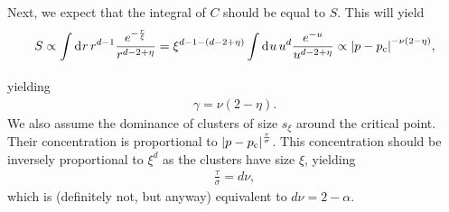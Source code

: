 Next, we expect that the integral of $C$ should be equal to $S$. This will yield
\begin{align*}
	S \propto \int\limits_{}^{}\dd[]{r}r^{d - 1}\frac{e^{-\frac{r}{\xi}}}{r^{d - 2 + \eta}} = \xi^{d - 1 - (d - 2 + \eta)}\int\limits_{}^{}\dd[]{u}u^{d}\frac{e^{-u}}{u^{d - 2 + \eta}} \propto \abs{p - p_{\text{c}}}^{-\nu(2 - \eta)},
\end{align*}
yielding
\begin{align*}
	\gamma = \nu(2 - \eta).
\end{align*}
We also assume the dominance of clusters of size $s_{\xi}$ around the critical point. Their concentration is proportional to $\abs{p - p_{\text{c}}}^{\frac{\tau}{\sigma}}$. This concentration should be inversely proportional to $\xi^{d}$ as the clusters have size $\xi$, yielding
\begin{align*}
	\frac{\tau}{\sigma} = d\nu,
\end{align*}
which is (definitely not, but anyway) equivalent to $d\nu = 2 - \alpha$.

